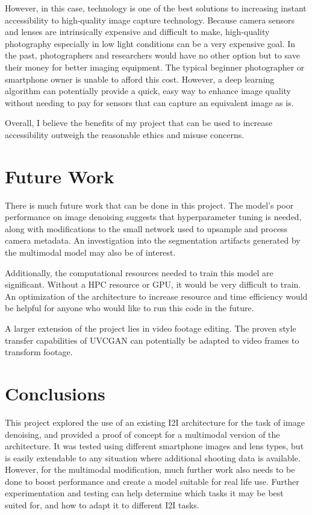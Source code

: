 \documentclass[10pt,twocolumn]{article}
\begin{document}
However, in this case, technology is one of the best solutions to increasing instant accessibility to high-quality image capture technology. Because camera sensors and lenses are intrinsically expensive and difficult to make, high-quality photography especially in low light conditions can be a very expensive goal. In the past, photographers and researchers would have no other option but to save their money for better imaging equipment. The typical beginner photographer or smartphone owner is unable to afford this cost. However, a deep learning algorithm can potentially provide a quick, easy way to enhance image quality without needing to pay for sensors that can capture an equivalent image as is. 

Overall, I believe the benefits of my project that can be used to increase accessibility outweigh the reasonable ethics and misuse concerns. 

\section{Future Work}

There is much future work that can be done in this project. The model's poor performance on image denoising suggests that hyperparameter tuning is needed, along with modifications to the small network used to upsample and process camera metadata. An investigation into the segmentation artifacts generated by the multimodal model may also be of interest.

Additionally, the computational resources needed to train this model are significant. Without a HPC resource or GPU, it would be very difficult to train. An optimization of the architecture to increase resource and time efficiency would be helpful for anyone who would like to run this code in the future.

A larger extension of the project lies in video footage editing. The proven style transfer capabilities of UVCGAN \cite{uvcgan} can potentially be adapted to video frames to transform footage.

\section{Conclusions}

This project explored the use of an existing I2I architecture for the task of image denoising, and provided a proof of concept for a multimodal version of the architecture. It was tested using different smartphone images and lens types, but is easily extendable to any situation where additional shooting data is available. However, for the multimodal modification, much further work also needs to be done to boost performance and create a model suitable for real life use. Further experimentation and testing can help determine which tasks it may be best suited for, and how to adapt it to different I2I tasks.
\end{document}
